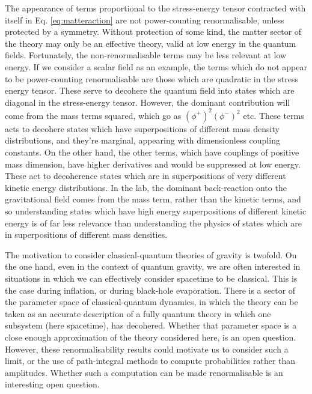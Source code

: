 \documentclass[aps,preprintnumbers,superscriptaddress,longbibliography]{revtex4-1}
\begin{document}
The appearance of terms proportional to the stress-energy tensor contracted with itself in Eq. \eqref{eq:matteraction} are not power-counting renormalisable, unless protected by a symmetry.  Without protection of some kind, the matter sector of the theory may only be an effective theory, valid at low energy in the quantum fields. Fortunately, the non-renormalisable terms may be less relevant at low energy. If we consider a scalar field as an example, the terms which do not appear to be power-counting renormalisable are those which are quadratic in the stress energy tensor. These serve to decohere the quantum field into states which are diagonal in the stress-energy tensor. However, the dominant contribution will come from the mass terms squared, which go as $(\phi^+)^2(\phi^-)^2$ etc. These terms acts to decohere states which have superpositions of different mass density distributions, and they're marginal, appearing with dimensionless coupling constants. On the other hand, the other terms, which have couplings of positive mass dimension, have higher derivatives and would be suppressed at low energy. These act to decoherence states which are in superpositions of very different kinetic energy distributions. In the lab, the dominant back-reaction onto the gravitational field comes from the mass term, rather than the kinetic terms, and so understanding states which have high energy superpositions of different kinetic energy is of far less relevance than understanding the physics of states which are in superpositions of different mass densities.




The motivation to consider classical-quantum theories of gravity is twofold. On the one hand, even in the context of quantum gravity, we are often interested in situations in which we can effectively consider spacetime to be classical. This is the case during inflation, or during black-hole evaporation. There is a sector of the parameter space of classical-quantum dynamics, in which the theory can be taken as an accurate description of a fully quantum theory in which one subsystem (here spacetime), has decohered\cite{UCLQQtoCQ}. Whether that parameter space is a close enough approximation of the theory considered here, is an open question. However, these renormalisability results could motivate us to consider such a limit, or the use of path-integral methods to compute probabilities rather than amplitudes. Whether such a computation can be made renormalisable is an interesting open question.
\end{document}
